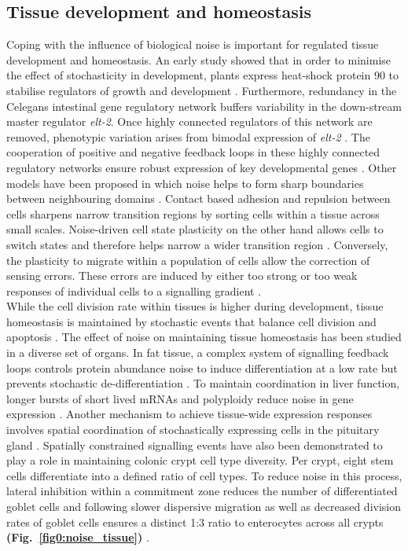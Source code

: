 \subsection{Tissue development and homeostasis}

Coping with the influence of biological noise is important for regulated tissue development and homeostasis. An early study showed that in order to minimise the effect of stochasticity in development, plants express heat-shock protein 90 to stabilise regulators of growth and development \citep{Queitsch2002}. Furthermore, redundancy in the \Gls{Celegans} intestinal gene regulatory network buffers variability in the down-stream master regulator \textit{elt-2}. Once highly connected regulators of this network are removed, phenotypic variation arises from bimodal expression of \textit{elt-2} \citep{Raj2010}. The cooperation of positive and negative feedback loops in these highly connected regulatory networks ensure robust expression of key developmental genes \citep{Ji2013}. Other models have been proposed in which noise helps to form sharp boundaries between neighbouring domains \citep{Zhang2012}. Contact based adhesion and repulsion between cells sharpens narrow transition regions by sorting cells within a tissue across small scales. Noise-driven cell state plasticity on the other hand allows cells to switch states and therefore helps narrow a wider transition region \citep{Wang2017}. Conversely, the plasticity to migrate within a population of cells allow the correction of sensing errors. These errors are induced by either too strong or too weak responses of individual cells to a signalling gradient \citep{Camley2017}.\\

While the cell division rate within tissues is higher during development, tissue homeostasis is maintained by stochastic events that balance cell division and apoptosis \citep{Ranft2010}. The effect of noise on maintaining tissue homeostasis has been studied in a diverse set of organs. In fat tissue, a complex system of signalling feedback loops controls protein abundance noise to induce differentiation at a low rate but prevents stochastic de-differentiation \citep{Ahrends2014}. To maintain coordination in liver function, longer bursts of short lived mRNAs and polyploidy reduce noise in gene expression \citep{BaharHalpern2015}. Another mechanism to achieve tissue-wide expression responses involves spatial coordination of stochastically expressing cells in the pituitary gland \citep{Featherstone2016}. Spatially constrained signalling events have also been demonstrated to play a role in maintaining colonic crypt cell type diversity. Per crypt, eight stem cells differentiate into a defined ratio of cell types. To reduce noise in this process, lateral inhibition within a commitment zone reduces the number of differentiated goblet cells and following slower dispersive migration as well as decreased division rates of goblet cells ensures a distinct 1:3 ratio to enterocytes across all crypts \textbf{(Fig.~\ref{fig0:noise_tissue})} \citep{Toth2017}.

